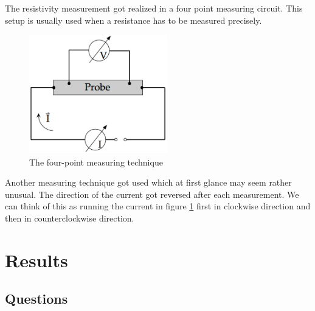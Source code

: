 \documentclass[a4paper,parskip,11pt, DIV12]{scrreprt}
\begin{document}
The resistivity measurement got realized in a four point measuring circuit. This setup is usually used when a resistance has to be measured precisely. 

\begin{figure}[H]
\centering
\includegraphics[width=6cm]{vierpunkt.png}
\caption{The four-point measuring technique}
\label{vierpunkt}
\end{figure}


Another measuring technique got used which at first glance may seem rather unusual. The direction of the current got reversed after each measurement. We can think of this as running the current in figure \ref{vierpunkt} first in clockwise direction and then in counterclockwise direction.


\chapter{Results}

\section{Questions}
\end{document}
